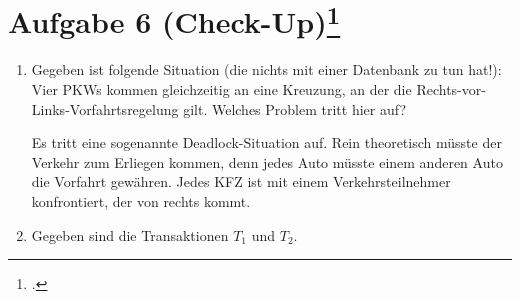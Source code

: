 \documentclass{bschlangaul-aufgabe}
\begin{document}

\section{
Aufgabe 6 (Check-Up)\footcite[Aufgabe 6]{db:ab:6}
}

\begin{enumerate}


\item Gegeben ist folgende Situation (die nichts mit einer Datenbank zu
tun hat!): Vier PKWs kommen gleichzeitig an eine Kreuzung, an der die
Rechts-vor-Links-Vorfahrtsregelung gilt. Welches Problem tritt hier auf?

\begin{bAntwort}
Es tritt eine sogenannte Deadlock-Situation auf. Rein
theoretisch müsste der Verkehr zum Erliegen kommen, denn jedes Auto
müsste einem anderen Auto die Vorfahrt gewähren. Jedes KFZ ist mit einem
Verkehrsteilnehmer konfrontiert, der von rechts kommt.
\end{bAntwort}


\item Gegeben sind die Transaktionen $T_1$ und $T_2$.


\end{enumerate}
\end{document}
